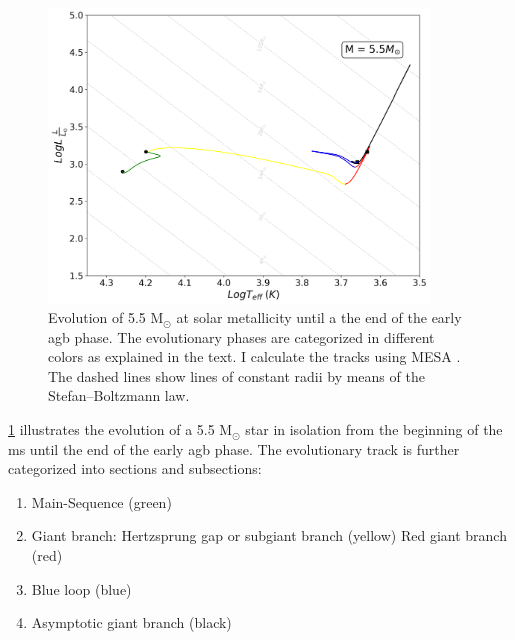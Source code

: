 \begin{figure}[H]
    \centering
    \includegraphics[width=0.9\textwidth]{Thesis/graphs/HR_evolution.pdf}
    \caption{Evolution of 5.5 M$_{\odot}$ at solar metallicity until a the end of the early \ac{agb} phase. The evolutionary phases are categorized in different colors as explained in the text. I calculate the tracks using MESA \citep{paxton2010modules,paxton2013modules,paxton2015modules,paxton2019modules}. The dashed lines show lines of constant radii by means of the Stefan–Boltzmann law.}
    \label{fig:HR_evolution}
\end{figure}
\cref{fig:HR_evolution} illustrates the evolution of a 5.5 M$_{\odot}$ star in isolation from the beginning of the \ac{ms} until the end of the early \ac{agb} phase. The evolutionary track is further categorized into sections and subsections: 
\begin{enumerate}
    \item Main-Sequence (green)
    \item Giant branch: 
        \subitem Hertzsprung gap or subgiant branch (yellow) 
        \subitem Red giant branch (red)
    \item Blue loop (blue)
    \item Asymptotic giant branch (black)
\end{enumerate}
